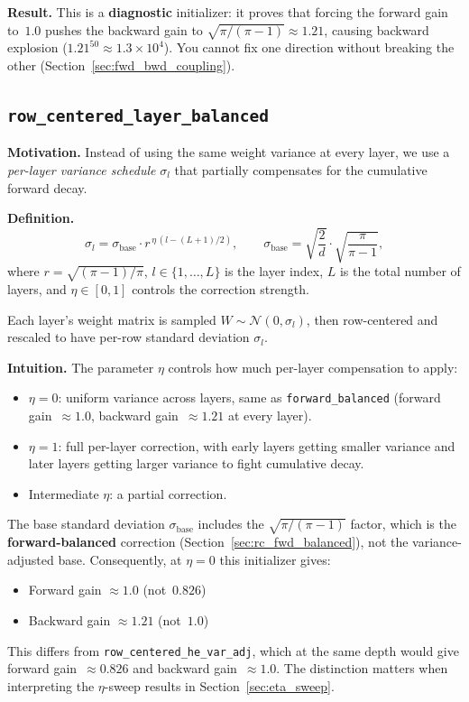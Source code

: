 \textbf{Result.}
This is a \textbf{diagnostic} initializer: it proves that forcing
the forward gain to~$1.0$ pushes the backward gain to
$\sqrt{\pi/(\pi-1)} \approx 1.21$, causing backward explosion
($1.21^{50} \approx 1.3 \times 10^4$).
You cannot fix one direction without breaking the other
(Section~\ref{sec:fwd_bwd_coupling}).

\subsection{\texttt{row\_centered\_layer\_balanced}}
\label{sec:layer_balanced}

\textbf{Motivation.}
Instead of using the same weight variance at every layer, we use a
\emph{per-layer variance schedule} $\sigma_l$ that partially
compensates for the cumulative forward decay.

\textbf{Definition.}
\begin{equation}\label{eq:layer_balanced}
  \sigma_l = \sigma_{\mathrm{base}} \cdot r^{\,\eta\,(l - (L+1)/2)},
  \qquad
  \sigma_{\mathrm{base}} = \sqrt{\frac{2}{d}} \cdot \sqrt{\frac{\pi}{\pi-1}},
\end{equation}
where $r = \sqrt{(\pi-1)/\pi}$, $l \in \{1,\dots,L\}$ is the layer
index, $L$ is the total number of layers, and $\eta \in [0,1]$ controls
the correction strength.

Each layer's weight matrix is sampled $W \sim \mathcal{N}(0, \sigma_l)$,
then row-centered and rescaled to have per-row standard deviation
$\sigma_l$.

\textbf{Intuition.}
The parameter $\eta$ controls how much per-layer compensation to apply:
\begin{itemize}
  \item $\eta = 0$: uniform variance across layers, same as
        \texttt{forward\_balanced} (forward gain~$\approx 1.0$,
        backward gain~$\approx 1.21$ at every layer).
  \item $\eta = 1$: full per-layer correction, with early layers
        getting smaller variance and later layers getting larger
        variance to fight cumulative decay.
  \item Intermediate $\eta$: a partial correction.
\end{itemize}

\begin{flagbox}
  The base standard deviation $\sigma_{\mathrm{base}}$ includes the
  $\sqrt{\pi/(\pi-1)}$ factor, which is the \textbf{forward-balanced}
  correction (Section~\ref{sec:rc_fwd_balanced}), not the variance-adjusted
  base.  Consequently, at $\eta = 0$ this initializer gives:
  \begin{itemize}
    \item Forward gain $\approx 1.0$ (not~$0.826$)
    \item Backward gain $\approx 1.21$ (not~$1.0$)
  \end{itemize}
  This differs from \texttt{row\_centered\_he\_var\_adj}, which at the
  same depth would give forward gain~$\approx 0.826$ and backward
  gain~$\approx 1.0$.  The distinction matters when interpreting the
  $\eta$-sweep results in Section~\ref{sec:eta_sweep}.
\end{flagbox}

